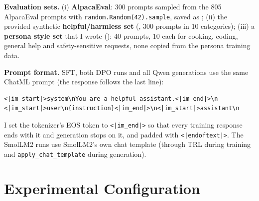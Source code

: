 \documentclass[10pt]{article}
\begin{document}
\textbf{Evaluation sets.} (i) \textbf{AlpacaEval}: 300 prompts sampled from the 805 AlpacaEval prompts with \texttt{random.Random(42).sample}, saved as ; (ii) the provided synthetic \textbf{helpful/harmless set} (, 300 prompts in 10 categories); (iii) a \textbf{persona style set} that I wrote (): 40 prompts, 10 each for cooking, coding, general help and safety-sensitive requests, none copied from the persona training data.

\textbf{Prompt format.} SFT, both DPO runs and all Qwen generations use the same ChatML prompt (the response follows the last line):
{\footnotesize
\begin{verbatim}
<|im_start|>system\nYou are a helpful assistant.<|im_end|>\n
<|im_start|>user\n{instruction}<|im_end|>\n<|im_start|>assistant\n
\end{verbatim}}
\vspace{-0.6em}
I set the tokenizer's EOS token to \texttt{<|im\_end|>} so that every training response ends with it and generation stops on it, and padded with \texttt{<|endoftext|>}. The SmolLM2 runs use SmolLM2's own chat template (through TRL during training and \texttt{apply\_chat\_template} during generation).

\section{Experimental Configuration}
\end{document}
